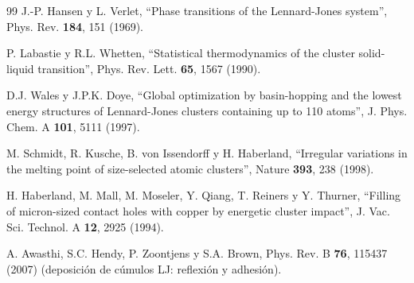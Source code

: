 \documentclass[11pt,a4paper]{article}
\begin{document}
\begin{thebibliography}{99}
J.-P. Hansen y L. Verlet, ``Phase transitions of the Lennard-Jones
system'', Phys. Rev. \textbf{184}, 151 (1969).

P. Labastie y R.L. Whetten, ``Statistical thermodynamics of the cluster
solid-liquid transition'', Phys. Rev. Lett. \textbf{65}, 1567 (1990).

D.J. Wales y J.P.K. Doye, ``Global optimization by basin-hopping and the
lowest energy structures of Lennard-Jones clusters containing up to 110
atoms'', J. Phys. Chem. A \textbf{101}, 5111 (1997).

M. Schmidt, R. Kusche, B. von Issendorff y H. Haberland, ``Irregular
variations in the melting point of size-selected atomic clusters'',
Nature \textbf{393}, 238 (1998).

H. Haberland, M. Mall, M. Moseler, Y. Qiang, T. Reiners y Y. Thurner,
``Filling of micron-sized contact holes with copper by energetic cluster
impact'', J. Vac. Sci. Technol. A \textbf{12}, 2925 (1994).

A. Awasthi, S.C. Hendy, P. Zoontjens y S.A. Brown,
Phys. Rev. B \textbf{76}, 115437 (2007) (deposición de cúmulos LJ:
reflexión y adhesión).

\end{thebibliography}
\end{document}
